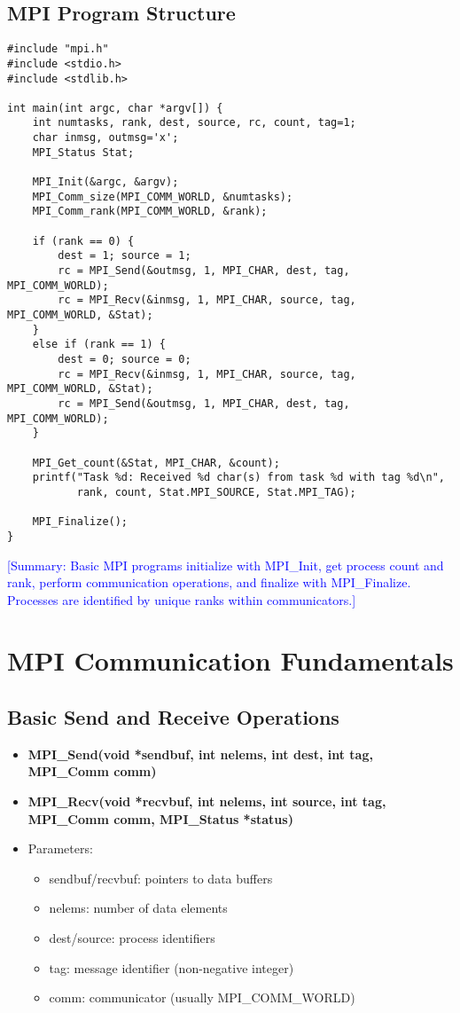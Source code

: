 \documentclass[12pt]{article}
\begin{document}
\subsection{MPI Program Structure}
\begin{verbatim}
#include "mpi.h"
#include <stdio.h>
#include <stdlib.h>

int main(int argc, char *argv[]) {
    int numtasks, rank, dest, source, rc, count, tag=1;
    char inmsg, outmsg='x';
    MPI_Status Stat;
    
    MPI_Init(&argc, &argv);
    MPI_Comm_size(MPI_COMM_WORLD, &numtasks);
    MPI_Comm_rank(MPI_COMM_WORLD, &rank);
    
    if (rank == 0) {
        dest = 1; source = 1;
        rc = MPI_Send(&outmsg, 1, MPI_CHAR, dest, tag, MPI_COMM_WORLD);
        rc = MPI_Recv(&inmsg, 1, MPI_CHAR, source, tag, MPI_COMM_WORLD, &Stat);
    }
    else if (rank == 1) {
        dest = 0; source = 0;
        rc = MPI_Recv(&inmsg, 1, MPI_CHAR, source, tag, MPI_COMM_WORLD, &Stat);
        rc = MPI_Send(&outmsg, 1, MPI_CHAR, dest, tag, MPI_COMM_WORLD);
    }
    
    MPI_Get_count(&Stat, MPI_CHAR, &count);
    printf("Task %d: Received %d char(s) from task %d with tag %d\n", 
           rank, count, Stat.MPI_SOURCE, Stat.MPI_TAG);
    
    MPI_Finalize();
}
\end{verbatim}

\textcolor{blue}{[Summary: Basic MPI programs initialize with MPI\_Init, get process count and rank, perform communication operations, and finalize with MPI\_Finalize. Processes are identified by unique ranks within communicators.]}

\section{MPI Communication Fundamentals}

\subsection{Basic Send and Receive Operations}
\begin{itemize}
    \item \textbf{MPI\_Send(void *sendbuf, int nelems, int dest, int tag, MPI\_Comm comm)}
    \item \textbf{MPI\_Recv(void *recvbuf, int nelems, int source, int tag, MPI\_Comm comm, MPI\_Status *status)}
    \item Parameters:
          \begin{itemize}
              \item sendbuf/recvbuf: pointers to data buffers
              \item nelems: number of data elements
              \item dest/source: process identifiers
              \item tag: message identifier (non-negative integer)
              \item comm: communicator (usually MPI\_COMM\_WORLD)
          \end{itemize}
\end{itemize}
\end{document}
